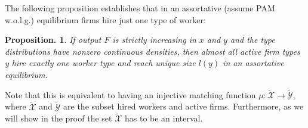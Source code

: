 \documentclass[12pt]{article}
\newtheorem{prop}{Proposition. }
\theoremstyle{definition}
\begin{document}
The following proposition establishes that in an assortative (assume PAM w.o.l.g.) equilibrium firms hire just one type of worker:

\begin{prop}\label{prop1}
If output $F$ is strictly increasing in $x$ and $y$ and the type distributions have nonzero continuous densities, then almost all active firm types y hire exactly one worker type and reach unique size $l(y)$ in an assortative equilibrium.
\end{prop}

Note that this is equivalent to having an injective matching function $\mu: \tilde{\mathcal{X}} \rightarrow \tilde{\mathcal{Y}}$, where $\tilde{\mathcal{X}}$ and $\tilde{\mathcal{Y}}$ are the subset hired workers and active firms. Furthermore, as we will show in the proof the set $\tilde{\mathcal{X}}$ has to be an interval.
\end{document}
